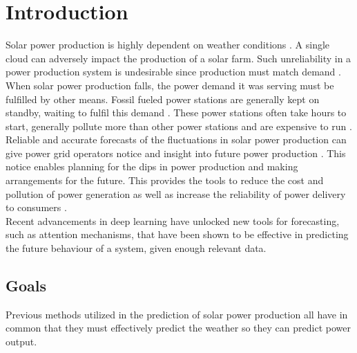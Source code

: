 \chapter{Introduction\label{cha:introduction}}

\vspace{1.5cm}

Solar power production is highly dependent on weather conditions \cite{lin_temporal_2020, lee_forecasting_2018, jaidee_very_2019, su_machine_2019, jang_solar_2016}. A single cloud can adversely impact the production of a solar farm. Such unreliability in a power production system is undesirable since production must match demand \cite{lee_forecasting_2018}. When solar power production falls, the power demand it was serving must be fulfilled by other means. Fossil fueled power stations are generally kept on standby, waiting to fulfil this demand \cite{lee_forecasting_2018}. These power stations often take hours to start, generally pollute more than other power stations and are expensive to run \cite{lee_forecasting_2018}.\\
Reliable and accurate forecasts of the fluctuations in solar power production can give power grid operators notice and insight into future power production \cite{lee_forecasting_2018}. This notice enables planning for the dips in power production and making arrangements for the future. This provides the tools to reduce the cost and pollution of power generation as well as increase the reliability of power delivery to consumers \cite{lee_forecasting_2018}.\\

Recent advancements in deep learning have unlocked new tools for forecasting, such as attention mechanisms, that have been shown to be effective in predicting the future behaviour of a system, given enough relevant data.\\



 \newpage
\section{Goals}
Previous methods utilized in the prediction of solar power production all have in common that they must effectively predict the weather so they can predict power output.

